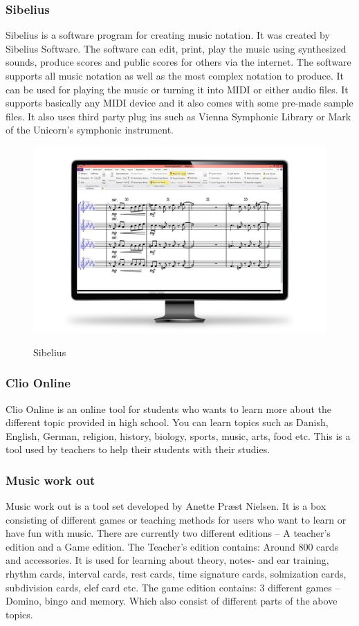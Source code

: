 \subsubsection{Sibelius}
Sibelius is a software program for creating music notation. It was created by Sibelius Software. The software can edit, print, play the music using synthesized sounds, produce scores and public scores for others via the internet. The software supports all music notation as well as the most complex notation to produce. It can be used for playing the music or turning it into MIDI or either audio files. It supports basically any MIDI device and it also comes with some pre-made sample files. It also uses third party plug ins such as Vienna Symphonic Library or Mark of the Unicorn’s symphonic instrument.  

\begin{figure}[H]
	\centering
	\includegraphics[width=0.7\linewidth]{figure/Analysis/Sibelius}
	\label{fig:sibelius}
	\caption{Sibelius}
\end{figure}

\subsubsection{Clio Online}
Clio Online is an online tool for students who wants to learn more about the different topic provided in high school. You can learn topics such as Danish, English, German, religion, history, biology, sports, music, arts, food etc. This is a tool used by teachers to help their students with their studies. 

\subsubsection{Music work out}
Music work out is a tool set developed by Anette Præst Nielsen. It is a box consisting of different games or teaching methods for users who want to learn or have fun with music. There are currently two different editions – A teacher’s edition and a Game edition.  The Teacher’s edition contains: Around 800 cards and accessories. It is used for learning about theory, notes- and ear training, rhythm cards, interval cards, rest cards, time signature cards, solmization cards, subdivision cards, clef card etc. The game edition contains: 3 different games – Domino, bingo and memory. Which also consist of different parts of the above topics. 


